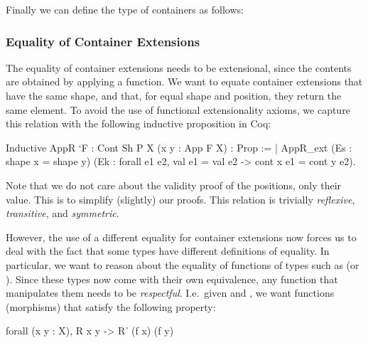 \documentclass[anonymous, a4paper, UKenglish, cleveref, autoref, thm-restate]{lipics-v2021}
\begin{document}
Finally we can define the type of containers as follows:

\subsubsection{Equality of Container Extensions}
The equality of container extensions needs to be extensional, since the
contents are obtained by applying a function. We want to equate container
extensions that have the same shape, and that, for equal shape and position,
they return the same element. To avoid the use of functional extensionality
axioms, we capture this relation with the following inductive proposition in
Coq:
\begin{coqcode}
Inductive AppR `{F : Cont Sh P} {X} (x y : App F X) : Prop :=
| AppR_ext (Es : shape x = shape y)
           (Ek : forall e1 e2, val e1 = val e2 -> cont x e1 = cont y e2).
\end{coqcode}
Note that  we do not care about the validity proof of the positions, only their
value. This is to simplify (slightly) our proofs. This relation is
trivially \emph{reflexive}, \emph{transitive}, and \emph{symmetric}.

However, the use of a different equality for container extensions now forces us
to deal with the fact that some types have different definitions of equality.
In particular, we want to reason about the equality of functions of types such
as  (or ). Since 
these types now come with their own equivalence, any function that manipulates
them needs to be \emph{respectful}. I.e.\ given 
 and ,
we want functions (morphisms) that satisfy the following property:
\begin{coqcode}
forall (x y : X), R x y -> R' (f x) (f y)
\end{coqcode}
\end{document}
